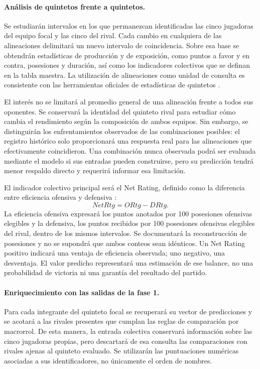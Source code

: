 \paragraph*{Análisis de quintetos frente a quintetos.}
Se estudiarán intervalos en los que permanezcan identificadas las cinco jugadoras del equipo focal y las cinco del rival. Cada cambio en cualquiera de las alineaciones delimitará un nuevo intervalo de coincidencia. Sobre esa base se obtendrán estadísticas de producción y de exposición, como puntos a favor y en contra, posesiones y duración, así como los indicadores colectivos que se definan en la tabla maestra. La utilización de alineaciones como unidad de consulta es consistente con las herramientas oficiales de estadísticas de quintetos \cite{wnbaStatsLineupsTool}.

El interés no se limitará al promedio general de una alineación frente a todos sus oponentes. Se conservará la identidad del quinteto rival para estudiar cómo cambia el rendimiento según la composición de ambos equipos. Sin embargo, se distinguirán los enfrentamientos observados de las combinaciones posibles: el registro histórico solo proporcionará una respuesta real para las alineaciones que efectivamente coincidieron. Una combinación nunca observada podrá ser evaluada mediante el modelo si sus entradas pueden construirse, pero su predicción tendrá menor respaldo directo y requerirá informar esa limitación.

El indicador colectivo principal será el Net Rating, definido como la diferencia entre eficiencia ofensiva y defensiva \cite{nbaGlosarioFase2}:
\[
 NetRtg=ORtg-DRtg.
\]
La eficiencia ofensiva expresará los puntos anotados por 100 posesiones ofensivas elegibles y la defensiva, los puntos recibidos por 100 posesiones ofensivas elegibles del rival, dentro de los mismos intervalos. Se documentará la reconstrucción de posesiones y no se supondrá que ambos conteos sean idénticos. Un Net Rating positivo indicará una ventaja de eficiencia observada; uno negativo, una desventaja. El valor predicho representará una estimación de ese balance, no una probabilidad de victoria ni una garantía del resultado del partido.

\paragraph*{Enriquecimiento con las salidas de la fase 1.}
Para cada integrante del quinteto focal se recuperará su vector de predicciones y se acotará a las rivales presentes que cumplan las reglas de comparación por macrorrol. De esta manera, la entrada colectiva conservará información sobre las cinco jugadoras propias, pero descartará de esa consulta las comparaciones con rivales ajenas al quinteto evaluado. Se utilizarán las puntuaciones numéricas asociadas a sus identificadores, no únicamente el orden de nombres.

